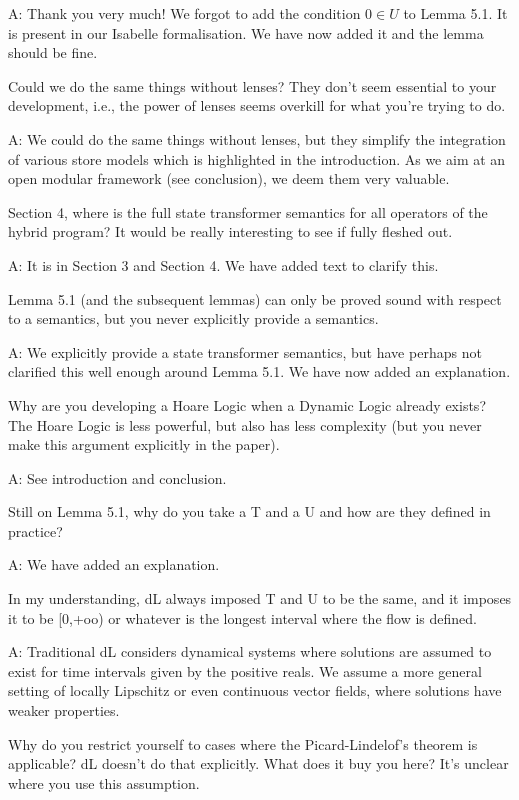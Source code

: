 \documentclass[envcountsame,envcountsect]{llncs}
\begin{document}
A: Thank you very much! We forgot to add the condition $0\in U$ to Lemma 5.1. It is present in our Isabelle formalisation. We have now added it and the lemma should be fine.

Could we do the same things without lenses? They don't seem essential to your development, i.e., the power of lenses seems overkill for what you're trying to do.

A: We could do the same things without lenses, but they simplify the integration of various store models which is highlighted in the introduction. As we aim at an open modular framework (see conclusion), we deem them very valuable. 

Section 4, where is the full state transformer semantics for all operators of the hybrid program? It would be really interesting to see if fully fleshed out.

A: It is in Section 3 and Section 4. We have added text to clarify this.

Lemma 5.1 (and the subsequent lemmas) can only be proved sound with respect to a semantics, but you never explicitly provide a semantics.

A: We explicitly provide a state transformer semantics, but have perhaps not clarified this well enough around Lemma 5.1. We have now added an explanation.

Why are you developing a Hoare Logic when a Dynamic Logic already exists? The Hoare Logic is less powerful, but also has less complexity (but you never make this argument explicitly in the paper).

A: See introduction and conclusion.

Still on Lemma 5.1, why do you take a T and a U and how are they defined in practice? 

A: We have added an explanation.

In my understanding, dL always imposed T and U to be the same, and it imposes it to be [0,+oo) or whatever is the longest interval where the flow is defined.
 
A: Traditional dL considers dynamical systems where solutions are assumed to exist for time intervals given by the positive reals. We assume a more general setting of locally Lipschitz or even continuous vector fields, where solutions have weaker properties.

Why do you restrict yourself to cases where the Picard-Lindelof's theorem is applicable? dL doesn't do that explicitly. What does it buy you here? It's unclear where you use this assumption.
\end{document}

